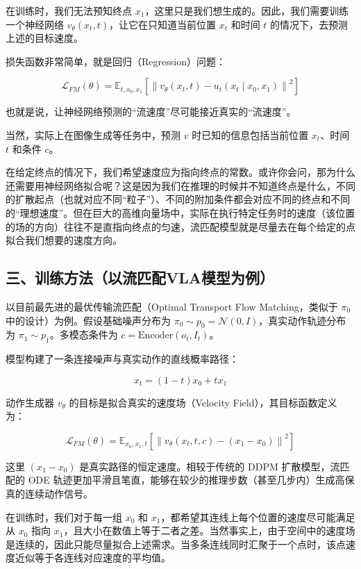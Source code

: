 在训练时，我们无法预知终点 \(x_1\)，这里只是我们想生成的。因此，我们需要训练一个神经网络 \(v_\theta(x_t,t)\)，让它在只知道当前位置 \(x_t\) 和时间 \(t\) 的情况下，去预测上述的目标速度。

损失函数非常简单，就是回归（Regression）问题：

\[
\mathcal{L}_{FM}(\theta)=\mathbb{E}_{t,x_0,x_1}\left[\left\|v_\theta(x_t,t)-u_t(x_t\mid x_0,x_1)\right\|^2\right]
\]

也就是说，让神经网络预测的``流速度''尽可能接近真实的``流速度''。

当然，实际上在图像生成等任务中，预测 \(v\) 时已知的信息包括当前位置 \(x_t\)、时间 \(t\) 和条件 \(c\)。

在给定终点的情况下，我们希望速度应为指向终点的常数。或许你会问，那为什么还需要用神经网络拟合呢？这是因为我们在推理的时候并不知道终点是什么，不同的扩散起点（也就对应不同``粒子''）、不同的附加条件都会对应不同的终点和不同的``理想速度''。但在巨大的高维向量场中，实际在执行特定任务时的速度（该位置的场的方向）往往不是直指向终点的匀速，流匹配模型就是尽量去在每个给定的点拟合我们想要的速度方向。

\hypertarget{ux4e09ux8badux7ec3ux65b9ux6cd5ux4ee5ux6d41ux5339ux914dvlaux6a21ux578bux4e3aux4f8b}{%
\subsection{三、训练方法（以流匹配VLA模型为例）}\label{ux4e09ux8badux7ec3ux65b9ux6cd5ux4ee5ux6d41ux5339ux914dvlaux6a21ux578bux4e3aux4f8b}}

以目前最先进的最优传输流匹配（Optimal Transport Flow Matching，类似于 \(\pi_0\) 中的设计）为例。假设基础噪声分布为 \(\pi_0\sim p_0=\mathcal{N}(0,I)\)，真实动作轨迹分布为 \(\pi_1\sim p_1\)。多模态条件为 \(c=\mathrm{Encoder}(o_t,I_t)\)。

模型构建了一条连接噪声与真实动作的直线概率路径：

\[
x_t=(1-t)x_0+tx_1
\]

动作生成器 \(v_\theta\) 的目标是拟合真实的速度场（Velocity Field），其目标函数定义为：

\[
\mathcal{L}_{FM}(\theta)=\mathbb{E}_{x_0,x_1,t}\left[\left\|v_\theta(x_t,t,c)-(x_1-x_0)\right\|^2\right]
\]

这里 \((x_1-x_0)\) 是真实路径的恒定速度。相较于传统的 DDPM 扩散模型，流匹配的 ODE 轨迹更加平滑且笔直，能够在较少的推理步数（甚至几步内）生成高保真的连续动作信号。

在训练时，我们对于每一组 \(x_0\) 和 \(x_1\)，都希望其连线上每个位置的速度尽可能满足从 \(x_0\) 指向 \(x_1\)，且大小在数值上等于二者之差。当然事实上，由于空间中的速度场是连续的，因此只能尽量拟合上述需求。当多条连线同时汇聚于一个点时，该点速度近似等于各连线对应速度的平均值。

